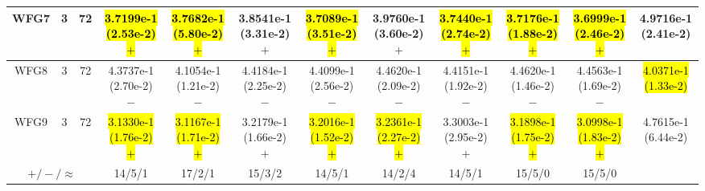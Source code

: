 \documentclass[journal]{IEEEtran}
\begin{document}
\begin{table*}[htbp]
\begin{tabular}{cccccccccccc}
\hline
\multirow{1}{*}{WFG7}&3&72&\hl{3.7199e-1 (2.53e-2) $+$}&\hl{3.7682e-1 (5.80e-2) $+$}&3.8541e-1 (3.31e-2) $+$&\hl{3.7089e-1 (3.51e-2) $+$}&3.9760e-1 (3.60e-2) $+$&\hl{3.7440e-1 (2.74e-2) $+$}&\hl{3.7176e-1 (1.88e-2) $+$}&\hl{3.6999e-1 (2.46e-2) $+$}&4.9716e-1 (2.41e-2)\\
\hline
\multirow{1}{*}{WFG8}&3&72&4.3737e-1 (2.70e-2) $-$&4.1054e-1 (1.21e-2) $-$&4.4184e-1 (2.25e-2) $-$&4.4099e-1 (2.56e-2) $-$&4.4620e-1 (2.09e-2) $-$&4.4151e-1 (1.92e-2) $-$&4.4620e-1 (1.46e-2) $-$&4.4563e-1 (1.69e-2) $-$&\hl{4.0371e-1 (1.33e-2)}\\
\hline
\multirow{1}{*}{WFG9}&3&72&\hl{3.1330e-1 (1.76e-2) $+$}&\hl{3.1167e-1 (1.71e-2) $+$}&3.2179e-1 (1.66e-2) $+$&\hl{3.2016e-1 (1.52e-2) $+$}&\hl{3.2361e-1 (2.27e-2) $+$}&3.3003e-1 (2.95e-2) $+$&\hl{3.1898e-1 (1.75e-2) $+$}&\hl{3.0998e-1 (1.83e-2) $+$}&4.7615e-1 (6.44e-2)\\
\hline
\multicolumn{3}{c}{$+/-/\approx$}&14/5/1&17/2/1&15/3/2&14/5/1&14/2/4&14/5/1&15/5/0&15/5/0&\\
\bottomrule
\end{tabular}
\label{No Label}
\end{table*}
\end{document}
